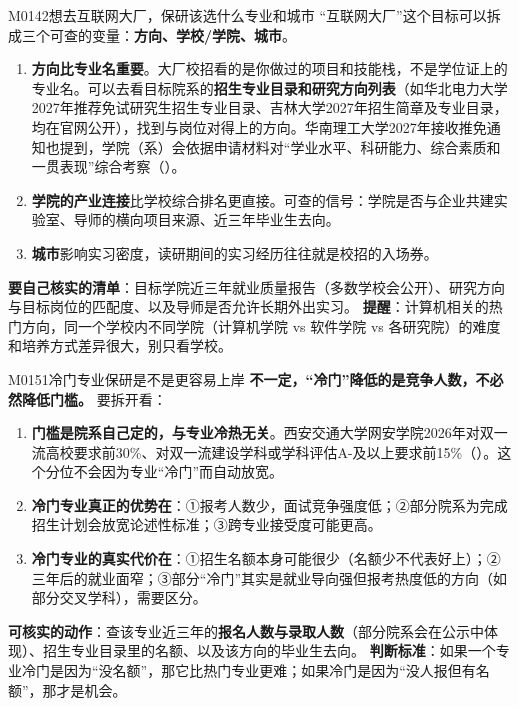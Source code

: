 \begin{qa}{M0142}{想去互联网大厂，保研该选什么专业和城市}
“互联网大厂”这个目标可以拆成三个可查的变量：\textbf{方向、学校/学院、城市}。
\begin{enumerate}
  \item \textbf{方向比专业名重要}。大厂校招看的是你做过的项目和技能栈，不是学位证上的专业名。可以去看目标院系的\textbf{招生专业目录和研究方向列表}（如华北电力大学2027年推荐免试研究生招生专业目录、吉林大学2027年招生简章及专业目录，均在官网公开），找到与岗位对得上的方向。华南理工大学2027年接收推免通知也提到，学院（系）会依据申请材料对“学业水平、科研能力、综合素质和一贯表现”综合考察（）。
  \item \textbf{学院的产业连接}比学校综合排名更直接。可查的信号：学院是否与企业共建实验室、导师的横向项目来源、近三年毕业生去向。
  \item \textbf{城市}影响实习密度，读研期间的实习经历往往就是校招的入场券。
\end{enumerate}
\textbf{要自己核实的清单}：目标学院近三年就业质量报告（多数学校会公开）、研究方向与目标岗位的匹配度、以及导师是否允许长期外出实习。
\textbf{提醒}：计算机相关的热门方向，同一个学校内不同学院（计算机学院 vs 软件学院 vs 各研究院）的难度和培养方式差异很大，别只看学校。
\end{qa}

\begin{qa}{M0151}{冷门专业保研是不是更容易上岸}
\textbf{不一定，“冷门”降低的是竞争人数，不必然降低门槛。} 要拆开看：
\begin{enumerate}
  \item \textbf{门槛是院系自己定的，与专业冷热无关}。西安交通大学网安学院2026年对双一流高校要求前30\%、对双一流建设学科或学科评估A-及以上要求前15\%（）。这个分位不会因为专业“冷门”而自动放宽。
  \item \textbf{冷门专业真正的优势在}：①报考人数少，面试竞争强度低；②部分院系为完成招生计划会放宽论述性标准；③跨专业接受度可能更高。
  \item \textbf{冷门专业的真实代价在}：①招生名额本身可能很少（名额少不代表好上）；②三年后的就业面窄；③部分“冷门”其实是就业导向强但报考热度低的方向（如部分交叉学科），需要区分。
\end{enumerate}
\textbf{可核实的动作}：查该专业近三年的\textbf{报名人数与录取人数}（部分院系会在公示中体现）、招生专业目录里的名额、以及该方向的毕业生去向。
\textbf{判断标准}：如果一个专业冷门是因为“没名额”，那它比热门专业更难；如果冷门是因为“没人报但有名额”，那才是机会。
\end{qa}

